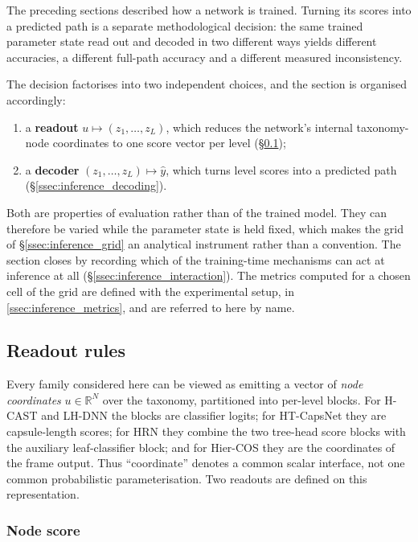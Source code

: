 The preceding sections described how a network is trained. Turning its scores
into a predicted path is a separate methodological decision: the same trained
parameter state read out and decoded in two different ways yields different
accuracies, a different full-path accuracy and a different
measured inconsistency.

The decision factorises into two independent choices, and the section is
organised accordingly:

\begin{enumerate}
    \item a \textbf{readout} $u\mapsto(z_1,\dots,z_L)$, which reduces the
    network's internal taxonomy-node coordinates to one score vector per level
    (\S\ref{ssec:inference_readout});
    \item a \textbf{decoder} $(z_1,\dots,z_L)\mapsto\hat y$, which turns level
    scores into a predicted path (\S\ref{ssec:inference_decoding}).
\end{enumerate}

Both are properties of evaluation rather than of the trained model. They can
therefore be varied while the parameter state is held fixed, which makes the grid
of \S\ref{ssec:inference_grid} an analytical instrument rather than a convention.
The section closes by recording which of the training-time mechanisms can act
at inference at all
(\S\ref{ssec:inference_interaction}). The metrics computed for a chosen cell of
the grid are defined with the experimental setup, in
\cref{ssec:inference_metrics}, and are referred to here by name.

\subsection{Readout rules}
\label{ssec:inference_readout}

Every family considered here can be viewed as emitting a vector of
\emph{node coordinates} $u\in\mathbb{R}^{N}$ over the taxonomy, partitioned into
per-level blocks. For H-CAST and LH-DNN the blocks are classifier logits; for
HT-CapsNet they are capsule-length scores; for HRN they combine the two tree-head
score blocks with the auxiliary leaf-classifier block; and for Hier-COS they are
the coordinates of the frame output. Thus ``coordinate'' denotes a common
scalar interface, not one common probabilistic parameterisation. Two readouts
are defined on this representation.

\subsubsection{Node score}


